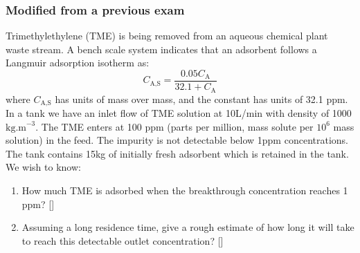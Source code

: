 \begin{frame}\frametitle{Modified from a previous exam}
	
	Trimethylethylene (TME) is being removed from an aqueous chemical plant waste stream. A bench scale system indicates that an adsorbent follows a Langmuir adsorption isotherm as:	
	\[
		C_\text{A,S} = \frac{0.05C_\text{A}}{32.1 + C_\text{A}}
	\]
	where $C_\text{A,S}$ has units of mass over mass, and the constant has units of 32.1 ppm. In a {} tank we have an inlet flow of TME solution at 10L/min with density of 1000$\text{kg.m}^{-3}$. The TME enters at 100 ppm (parts per million, mass solute per $10^6$ mass solution) in the feed. The impurity is not detectable below 1ppm concentrations. The tank contains 15kg of initially fresh adsorbent which is retained in the tank. We wish to know:
	
	\begin{enumerate}
		\item	How much TME is adsorbed when the breakthrough concentration reaches 1 ppm? [{\color{myOrange}{Ans: 22.65kg}}]
		\item	Assuming a long residence time, give a rough estimate of how long it will take to reach this detectable outlet concentration? [{\color{myOrange}{15.7 days}}]
	\end{enumerate}
\end{frame}


